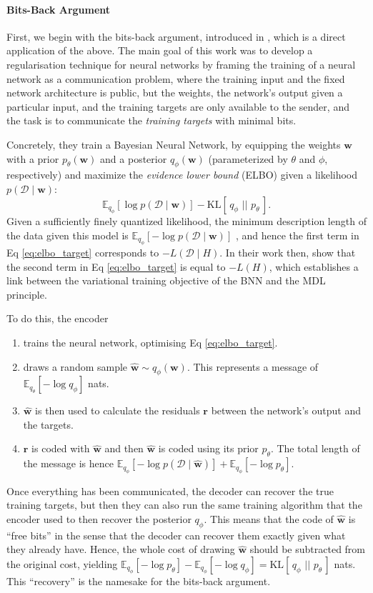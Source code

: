 \documentclass{article}
\renewcommand{\vec}[1]{\mathbf{#1}}
\newcommand{\KL}[2]{\mathrm{KL}[\,#1\,\,||\,\,#2\,]}
\newcommand{\Exp}{\mathbb{E}}
\newcommand{\Data}{\mathcal{D}}
\begin{document}
\paragraph{Bits-Back Argument}
First, we begin with the bits-back argument, introduced in
\cite{hinton1993keeping}, which is a direct application of the above. The main
goal of this work was to develop a regularisation technique for neural networks
by framing the training of a neural network as a communication problem, where
the training input and the fixed network architecture is public, but the weights,
the network's output given a particular input, and the training targets are
only available to the sender, and the task is to communicate the
\textit{training targets} with minimal bits.
\par
Concretely, they train a Bayesian Neural Network, by equipping the weights
$\vec{w}$ with a prior $p_\theta(\vec{w})$ and a posterior $q_\phi(\vec{w})$
(parameterized by $\theta$ and $\phi$, respectively) and maximize
the \textit{evidence lower bound} (ELBO) given a likelihood $p(\Data \mid \vec{w})$:
\begin{equation}
  \label{eq:elbo_target}
  \Exp_{q_\phi}[\log p(\Data \mid \vec{w})] - \KL{q_{\phi}}{p_{\theta}}.
\end{equation}
Given a sufficiently finely quantized likelihood, the minimum description length
of the data given this model is $\Exp_{q_\phi}[-\log p(\Data \mid \vec{w})]$
\cite{shannon1998mathematical}, and hence the first term in Eq
\ref{eq:elbo_target} corresponds to $-L(\Data \mid H)$. In their work then,
\cite{hinton1993keeping} show that the second term in Eq \ref{eq:elbo_target}
is equal to $-L(H)$, which establishes a link between the variational training
objective of the BNN and the MDL principle.
\par
To do this, the encoder
\begin{enumerate}
\item trains the neural network, optimising Eq \ref{eq:elbo_target}.
\item draws a random sample $\vec{\hat{w}} \sim q_{\phi}(\vec{w})$. This
  represents a message of $\Exp_{q_\theta}[- \log q_\phi]$ nats.
\item $\vec{\hat{w}}$ is then used to calculate the residuals $\vec{r}$ between
  the network's output and the targets.
\item $\vec{r}$ is coded with $\vec{\hat{w}}$ and then $\vec{\hat{w}}$ is coded
  using its prior $p_\theta$. The total length of the message is hence $\Exp_{q_\phi}[-\log
  p(\Data \mid \vec{\hat{w}})] + \Exp_{q_\phi}[-\log p_{\theta}]$.
\end{enumerate}
Once everything has been communicated, the decoder can recover the true training
targets, but then they can also run the same training algorithm that the encoder
used to then recover the posterior $q_\phi$. This means that the code of
$\vec{\hat{w}}$ is ``free bits'' in the sense that the decoder can recover them
exactly given what they already have. 
Hence, the whole cost of drawing $\vec{\hat{w}}$ should be
subtracted from the original cost, yielding
$\Exp_{q_\phi}[-\log p_{\theta}] - \Exp_{q_\phi}[-\log q_{\phi}] =
\KL{q_{\phi}}{p_\theta}$ nats. This ``recovery'' is the namesake for the
bits-back argument.
\end{document}
